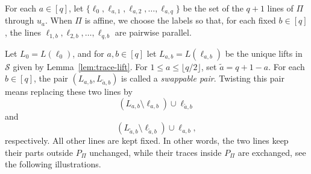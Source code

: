 \documentclass[reqno,a4paper,11pt]{article}
\theoremstyle{definition}
\theoremstyle{remark}
\begin{document}
For each $a\in [q]$, let
\(
\{\ell_0,\ell_{a,1},\ell_{a,2},\ldots,\ell_{a,q}\}
\)
be the set of the $q+1$ lines of $\Pi$ through $u_a$.
When $\Pi$ is affine, we choose the labels so that, for each fixed $b\in[q]$, the lines
\(\ell_{1,b},\ell_{2,b},\ldots,\ell_{q,b}\)
are pairwise parallel.

Let $L_0=L(\ell_0)$, and for $a,b\in[q]$ let
\(
L_{a,b}=L(\ell_{a,b})
\) 
be the unique lifts in $\mathcal S$ given by Lemma~\ref{lem:trace-lift}.
For $1\le a\le \lfloor q/2\rfloor$, set
\(
\widetilde a=q+1-a.
\)
For each $b\in[q]$, the pair $(L_{a,b},L_{\widetilde a,b})$ is called a \emph{swappable pair}.
Twisting this pair means replacing these two lines by
\begin{equation}\label{eq:twist-a}
(L_{a,b}\setminus \ell_{a,b})\cup \ell_{\widetilde a,b}
\end{equation}
and
\begin{equation}\label{eq:twist-b}
(L_{\widetilde a,b}\setminus \ell_{\widetilde a,b})\cup \ell_{a,b},
\end{equation}
respectively.
All other lines are kept fixed.
In other words, the two lines keep their parts outside $P_\Pi$ unchanged,
while their traces inside $P_\Pi$ are exchanged, see the following illustrations.
\end{document}

